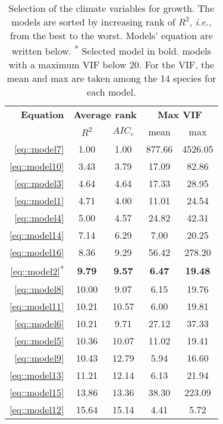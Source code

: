 \documentclass[letterpaper, 12pt]{article}
\newcommand {\ie}{\textit{i.e., }}
\theoremstyle{theo}
\begin{document}
\begin{refsection}
\begin{onehalfspace}
\begin{table}[h!]
\centering
\caption[Selection of the climate variables for growth]{Selection of the climate variables for growth. The models are sorted by increasing rank of $ R^2 $, \ie from the best to the worst. Models' equation are written below. \textsuperscript{*} Selected model in bold. \dag models with a maximum VIF below 20. For the VIF, the mean and max are taken among the 14 species for each model.}
\label{tab::climSelection}
\begin{tabular}{@{}rcccc@{}}
	\toprule
	\textbf{Equation} & \multicolumn{2}{c}{\textbf{Average rank}} & \multicolumn{2}{c}{\textbf{Max VIF}} \\
		\cmidrule(lr){2-3} \cmidrule(lr){4-5}
		& $ R^2 $ & $ AIC_c $ & mean & max \\
	\midrule
	\ref{eq::model7} & 1.00 & 1.00 & 877.66 & 4526.05 \\
	\ref{eq::model10} & 3.43 & 3.79 & 17.09 & 82.86 \\
	\ref{eq::model3} & 4.64 & 4.64 & 17.33 & 28.95 \\
	\ref{eq::model1} & 4.71 & 4.00 & 11.01 & 24.54 \\
	\ref{eq::model4} & 5.00 & 4.57 & 24.82 & 42.31 \\
	\ref{eq::model14} & 7.14 & 6.29 & 7.00 & 20.25 \\
	\ref{eq::model16} & 8.36 & 9.29 & 56.42 & 278.20 \\
	\ref{eq::model2}\textsuperscript{*} \dag & \textbf{9.79} & \textbf{9.57} & \textbf{6.47} & \textbf{19.48} \\
	\ref{eq::model8} \dag & 10.00 & 9.07 & 6.15 & 19.76 \\
	\ref{eq::model11} \dag & 10.21 & 10.57 & 6.00 & 19.81 \\
	\ref{eq::model6} & 10.21 & 9.71 & 27.12 & 37.33 \\
	\ref{eq::model5} \dag & 10.36 & 10.07 & 11.02 & 19.41 \\
	\ref{eq::model9} \dag & 10.43 & 12.79 & 5.94 & 16.60 \\
	\ref{eq::model13} & 11.21 & 12.14 & 6.13 & 21.94 \\
	\ref{eq::model15} & 13.86 & 13.36 & 38.30 & 223.09 \\
	\ref{eq::model12} \dag & 15.64 & 15.14 & 4.41 & 5.72 \\
	\bottomrule
\end{tabular}
\end{table}


\end{onehalfspace}
\end{refsection}
\end{document}
